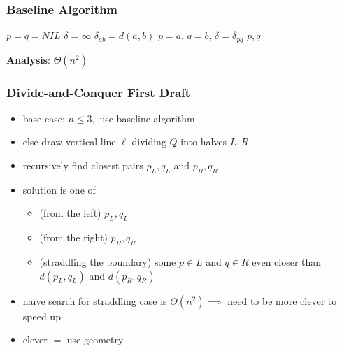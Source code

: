 \documentclass{beamer}
\begin{document}
\begin{frame} \frametitle{Baseline Algorithm}
  {\small
\begin{algorithmic}[1]
   
    \State $p = q = NIL$
    \State $\delta = \infty$
      \State $\delta_{ab} = d(a, b)$
        \State $p=a, \, q=b, \, \delta=\delta_{pq}$
      \EndIf
    \EndFor
    \State \Return $p, q$
  \EndFunction
\end{algorithmic}
}

\textbf{Analysis}: $\Theta(n^2)$
\end{frame}

\begin{frame} \frametitle{Divide-and-Conquer First Draft}
\begin{itemize}
  \item base case: $n \leq 3,$ use baseline algorithm
  \item else draw vertical line $\ell$ dividing $Q$ into halves $L, R$
  \item recursively find closest pairs $p_L, q_L$ and $p_R, q_R$
  \item solution is one of
  \begin{itemize}
    \item (from the left) $p_L, q_L$
    \item (from the right) $p_R, q_R$
    \item (straddling the boundary) some $p \in L$ and $q \in R$ even closer
      than $d(p_L, q_L)$ and $d(p_R, q_R)$
  \end{itemize}
  \item na\"{i}ve search for straddling case is $\Theta(n^2) \implies$ need to
    be more clever to speed up
  \item clever $=$ use geometry
\end{itemize}
\end{frame}
\end{document}
